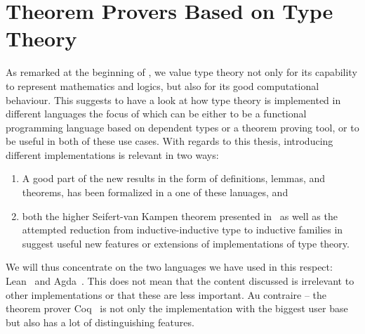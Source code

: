 \section{Theorem Provers Based on Type Theory}\label{sec:tt-provers}

As remarked at the beginning of , we value type theory not only
for its capability to represent mathematics and logics, but also for its good
computational behaviour.
This suggests to have a look at how type theory is implemented in different languages
the focus of which can be either to be a functional programming language based
on dependent types or a theorem proving tool, or to be useful in both of these
use cases.
With regards to this thesis, introducing different implementations is relevant
in two ways:
\begin{enumerate}
\item A good part of the new results in the form of definitions, lemmas,
and theorems, has been formalized in a one of these lanuages, and
\item both the higher Seifert-van Kampen theorem presented in~
as well as the attempted reduction from inductive-inductive type to inductive
families in ~ suggest useful new features or extensions of implementations
of type theory.
\end{enumerate}
We will thus concentrate on the two languages we have used in this respect:
Lean~\citep{mouracade} and Agda~\citep{agda}.
This does not mean that the content discussed is irrelevant to other implementations
or that these are less important.
Au contraire -- the theorem prover Coq~\citep{coq} is not only the implementation
with the biggest user base but also has a lot of distinguishing features.


